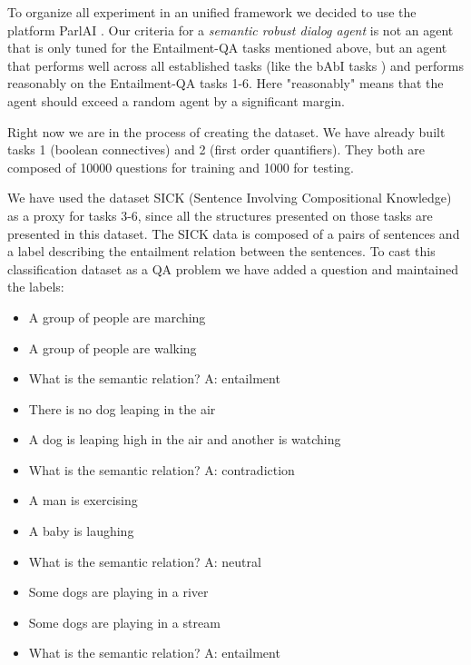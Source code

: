 To organize all experiment in an unified framework we decided to use the platform ParlAI \cite{MillerFFLBBPW17}. Our criteria for a \textit{semantic robust dialog agent} is not an agent that is only tuned for the Entailment-QA tasks mentioned above, but an agent that performs well across all established tasks (like the bAbI tasks \cite{WestonBCM15}) and performs reasonably on the Entailment-QA tasks 1-6. Here "reasonably" means that the agent should exceed a random agent by a significant margin.

Right now we are in the process of creating the dataset. We have already built tasks 1 (boolean connectives) and 2 (first order quantifiers). They both are composed of 10000 questions for training and 1000 for testing.

We have used the dataset SICK (Sentence Involving Compositional Knowledge) \cite{Marelli14} as a proxy for tasks 3-6, since all the structures presented on those tasks are presented in this dataset. The SICK data is composed of a pairs of sentences and a label describing the entailment relation between the sentences. To cast this classification dataset as a QA problem we have added a question and maintained the labels: 

\begin{itemize} 
\item[] A group of people are marching
\item[] A group of people are walking
\item[] What is the semantic relation? A: entailment
\end{itemize}

\begin{itemize} 
\item[] There is no dog leaping in the air
\item[] A dog is leaping high in the air and another is watching
\item[] What is the semantic relation? A: contradiction
\end{itemize}

\begin{itemize} 
\item[] A man is exercising
\item[] A baby is laughing
\item[] What is the semantic relation? A: neutral
\end{itemize}

\begin{itemize} 
\item[] Some dogs are playing in a river
\item[] Some dogs are playing in a stream
\item[] What is the semantic relation? A: entailment
\end{itemize}

